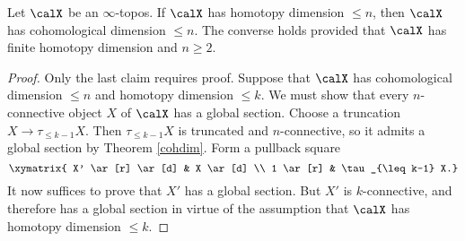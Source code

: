 \begin{corollary}\label{confusion}
Let $\calX$ be an $\infty$-topos. If $\calX$ has homotopy
dimension $\leq n$, then $\calX$ has cohomological dimension $\leq
n$. The converse holds provided that $\calX$ has finite homotopy
dimension and $n \geq 2$.
\end{corollary}

\begin{proof}
Only the last claim requires proof. Suppose that $\calX$ has
cohomological dimension $\leq n$ and homotopy dimension $\leq k$.
We must show that every $n$-connective object $X$ of $\calX$
has a global section. Choose a truncation $X \rightarrow \tau_{\leq k-1} X$.
Then $\tau_{\leq k-1} X$ is truncated and
$n$-connective, so it admits a global section by Theorem
\ref{cohdim}. Form a pullback square
$$ \xymatrix{ X' \ar[r] \ar[d] & X \ar[d] \\
1 \ar[r] & \tau_{\leq k-1} X.}$$
It now suffices to prove that $X'$ has a global section. But $X'$ is
$k$-connective, and therefore has a global section in virtue of the assumption that
$\calX$ has homotopy dimension $\leq k$.
\end{proof}

